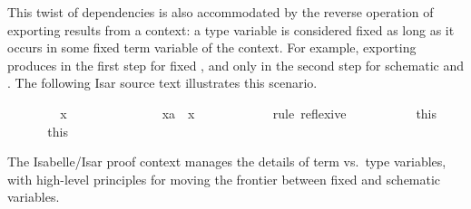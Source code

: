 \begin{isabellebody}
\begin{isamarkuptext}
  This twist of dependencies is also accommodated by the reverse
  operation of exporting results from a context: a type variable
  \isa{{\isasymalpha}} is considered fixed as long as it occurs in some fixed
  term variable of the context.  For example, exporting  produces in the first step  for fixed \isa{{\isasymalpha}}, and only in the second step
   for schematic  and \isa{{\isacharquery}{\isasymalpha}}.
  The following Isar source text illustrates this scenario.%
\end{isamarkuptext}%
\isamarkuptrue%
\isamarkupfalse%
\isanewline
%
\isadelimproof
\ \ %
\endisadelimproof
%
\isatagproof
\isacommand{{\isacharbraceleft}}\isamarkupfalse%
\isanewline
\ \ \ \ \isamarkupfalse%
\ x\ \ %
\isanewline
\ \ \ \ \isacommand{{\isacharbraceleft}}\isamarkupfalse%
\isanewline
\ \ \ \ \ \ \isamarkupfalse%
\ {\isachardoublequoteopen}x{\isacharcolon}{\isacharcolon}{\isacharprime}a\ {\isasymequiv}\ x{\isachardoublequoteclose}\ \ %
\isanewline
\ \ \ \ \ \ \ \ \isamarkupfalse%
\ {\isacharparenleft}rule\ reflexive{\isacharparenright}\isanewline
\ \ \ \ \isacommand{{\isacharbraceright}}\isamarkupfalse%
%
\endisatagproof
{\isafoldproof}%
%
\isadelimproof
\isanewline
%
\endisadelimproof
\ \ \ \ \isamarkupfalse%
\ this\ \ %
\isanewline
%
\isadelimproof
\ \ %
\endisadelimproof
%
\isatagproof
\isacommand{{\isacharbraceright}}\isamarkupfalse%
%
\endisatagproof
{\isafoldproof}%
%
\isadelimproof
\isanewline
%
\endisadelimproof
\ \ \isamarkupfalse%
\ this\ \ %
\isanewline
%
\isadelimproof
%
\endisadelimproof
%
\isatagproof
{}\isamarkupfalse%
%
\endisatagproof
{\isafoldproof}%
%
\isadelimproof
%
\endisadelimproof
%
\begin{isamarkuptext}%
The Isabelle/Isar proof context manages the details of term
  vs.\ type variables, with high-level principles for moving the
  frontier between fixed and schematic variables.


\end{isamarkuptext}
\end{isabellebody}

